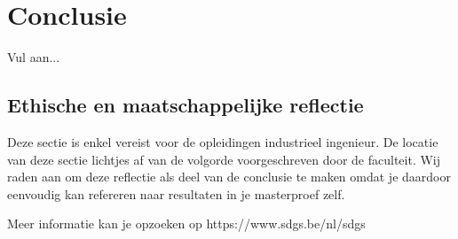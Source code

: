 \chapter*{Conclusie}

Vul aan...

\section*{Ethische en maatschappelijke reflectie}

Deze sectie is enkel vereist voor de opleidingen industrieel ingenieur. De locatie van deze sectie lichtjes af van de volgorde voorgeschreven door de faculteit. Wij raden aan om deze reflectie als deel van de conclusie te maken omdat je daardoor eenvoudig kan refereren naar resultaten in je masterproef zelf.

Meer informatie kan je opzoeken op https://www.sdgs.be/nl/sdgs



